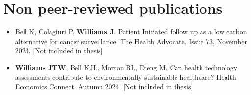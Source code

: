 \section*{Non peer-reviewed publications}
\begin{itemize}
    \item Bell K, Colagiuri P, \textbf{Williams J}. Patient Initiated follow up as a low carbon alternative for cancer surveillance. The Health Advocate. Issue 73, November 2023. [Not included in thesis]
    \item \textbf{Williams JTW}, Bell KJL, Morton RL, Dieng M. Can health technology assessments contribute to environmentally sustainable healthcare? Health Economics Connect. Autumn 2024. [Not included in thesis]
\end{itemize}